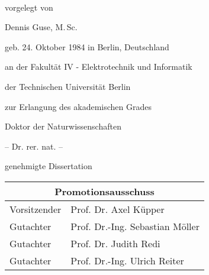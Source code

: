 \begin{titlepage}
    \begin{addmargin}[-1cm]{-3cm}
    \begin{center}
        \large  

        \hfill

        \vfill

        \vspace{3cm}

        \begingroup
            \color{Maroon}\spacedallcaps{\myTitle} \\ \bigskip
        \endgroup

        \vspace{1.6cm}	
				vorgelegt von
				
				\vspace{0.7cm}	
				Dennis Guse, M.\,Sc. 
				
				geb. 24. Oktober 1984 in Berlin, Deutschland



				\vspace{0.7cm}
				an der Fakultät IV - Elektrotechnik und Informatik
				
				der Technischen Universität Berlin
				
				zur Erlangung des akademischen Grades

				\vspace{0.7cm}
				Doktor der Naturwissenschaften
				
				-- Dr. rer. nat. --

				\vspace{0.7cm}
				genehmigte Dissertation
				\vspace{1.4cm}
				
				\centering
				\large
				\begin{tabular}{ll}
				\multicolumn{2}{c}{Promotionsausschuss} \\
				\hline				
				Vorsitzender  & Prof. Dr. Axel Küpper  \\
				Gutachter	& Prof. Dr.-Ing. Sebastian Möller \\
				Gutachter	& Prof. Dr. Judith Redi \\
				Gutachter	& Prof. Dr.-Ing. Ulrich Reiter \\
				\end{tabular}
			

\end{center}
\end{addmargin}
\end{titlepage}
